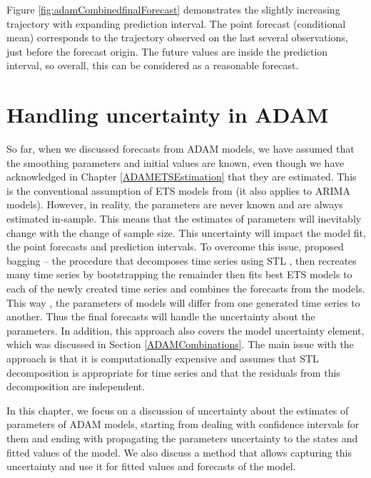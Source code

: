 \documentclass[
]{book}
\theoremstyle{definition}
\theoremstyle{definition}
\theoremstyle{definition}
\theoremstyle{definition}
\theoremstyle{remark}
\begin{document}
Figure \ref{fig:adamCombinedfinalForecast} demonstrates the slightly increasing trajectory with expanding prediction interval. The point forecast (conditional mean) corresponds to the trajectory observed on the last several observations, just before the forecast origin. The future values are inside the prediction interval, so overall, this can be considered as a reasonable forecast.

\hypertarget{ADAMUncertainty}{%
\chapter{Handling uncertainty in ADAM}\label{ADAMUncertainty}}

So far, when we discussed forecasts from ADAM models, we have assumed that the smoothing parameters and initial values are known, even though we have acknowledged in Chapter \ref{ADAMETSEstimation} that they are estimated. This is the conventional assumption of ETS models from \citet{Hyndman2008b} (it also applies to ARIMA models). However, in reality, the parameters are never known and are always estimated in-sample. This means that the estimates of parameters will inevitably change with the change of sample size. This uncertainty will impact the model fit, the point forecasts and prediction intervals. To overcome this issue, \citet{Bergmeir2016} proposed bagging -- the procedure that decomposes time series using STL \citep{Cleveland1990}, then recreates many time series by bootstrapping the remainder then fits best ETS models to each of the newly created time series and combines the forecasts from the models. This way \citep[as was explained by][]{Petropoulos2018}, the parameters of models will differ from one generated time series to another. Thus the final forecasts will handle the uncertainty about the parameters. In addition, this approach also covers the model uncertainty element, which was discussed in Section \ref{ADAMCombinations}. The main issue with the approach is that it is computationally expensive and assumes that STL decomposition is appropriate for time series and that the residuals from this decomposition are independent.

In this chapter, we focus on a discussion of uncertainty about the estimates of parameters of ADAM models, starting from dealing with confidence intervals for them and ending with propagating the parameters uncertainty to the states and fitted values of the model. We also discuss a method that allows capturing this uncertainty and use it for fitted values and forecasts of the model.
\end{document}
